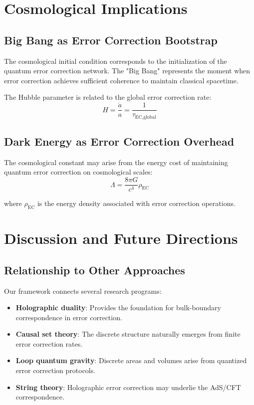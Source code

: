\documentclass[12pt]{article}
\begin{document}
\section{Cosmological Implications}

\subsection{Big Bang as Error Correction Bootstrap}

The cosmological initial condition corresponds to the initialization of the quantum error correction network. The "Big Bang" represents the moment when error correction achieves sufficient coherence to maintain classical spacetime.

The Hubble parameter is related to the global error correction rate:
\begin{equation}
H = \frac{\dot{a}}{a} = \frac{1}{\tau_{\text{EC,global}}}
\end{equation}

\subsection{Dark Energy as Error Correction Overhead}

The cosmological constant may arise from the energy cost of maintaining quantum error correction on cosmological scales:
\begin{equation}
\Lambda = \frac{8\pi G}{c^4} \rho_{\text{EC}}
\end{equation}

where $\rho_{\text{EC}}$ is the energy density associated with error correction operations.

\section{Discussion and Future Directions}

\subsection{Relationship to Other Approaches}

Our framework connects several research programs:

\begin{itemize}
\item \textbf{Holographic duality}: Provides the foundation for bulk-boundary correspondence in error correction.
\item \textbf{Causal set theory}: The discrete structure naturally emerges from finite error correction rates.
\item \textbf{Loop quantum gravity}: Discrete areas and volumes arise from quantized error correction protocols.
\item \textbf{String theory}: Holographic error correction may underlie the AdS/CFT correspondence.
\end{itemize}
\end{document}
